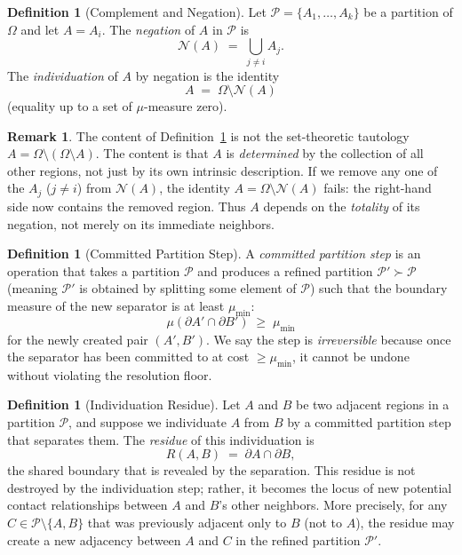 \documentclass[twocolumn]{article}
\theoremstyle{plain}
\theoremstyle{definition}
\newtheorem{definition}[theorem]{Definition}
\newtheorem{remark}[theorem]{Remark}
\newcommand{\PP}{\mathcal{P}}
\newcommand{\NN}{\mathcal{N}}
\newcommand{\mumin}{\mu_{\min}}
\begin{document}
\begin{definition}[Complement and Negation]
\label{def:negation}
Let $\PP = \{A_1, \ldots, A_k\}$ be a partition of $\Omega$ and let $A = A_i$.
The \emph{negation} of $A$ in $\PP$ is
\[
  \NN(A) \;=\; \bigcup_{j \neq i} A_j.
\]
The \emph{individuation} of $A$ by negation is the identity
\[
  A \;=\; \Omega \setminus \NN(A)
\]
(equality up to a set of $\mu$-measure zero).
\end{definition}

\begin{remark}
The content of Definition~\ref{def:negation} is not the set-theoretic tautology
$A = \Omega \setminus (\Omega \setminus A)$. The content is that $A$ is
\emph{determined} by the collection of all other regions, not just by its own
intrinsic description. If we remove any one of the $A_j$ ($j \neq i$) from
$\NN(A)$, the identity $A = \Omega \setminus \NN(A)$ fails: the right-hand side
now contains the removed region. Thus $A$ depends on the \emph{totality} of its
negation, not merely on its immediate neighbors.
\end{remark}

\begin{definition}[Committed Partition Step]
\label{def:committed}
A \emph{committed partition step} is an operation that takes a partition $\PP$
and produces a refined partition $\PP' \succ \PP$ (meaning $\PP'$ is obtained by
splitting some element of $\PP$) such that the boundary measure of the new
separator is at least $\mumin$:
\[
  \mu(\partial A' \cap \partial B') \;\geq\; \mumin
\]
for the newly created pair $(A', B')$. We say the step is \emph{irreversible}
because once the separator has been committed to at cost $\geq \mumin$, it cannot
be undone without violating the resolution floor.
\end{definition}

\begin{definition}[Individuation Residue]
\label{def:residue}
Let $A$ and $B$ be two adjacent regions in a partition $\PP$, and suppose we
individuate $A$ from $B$ by a committed partition step that separates them.
The \emph{residue} of this individuation is
\[
  R(A,B) \;=\; \partial A \cap \partial B,
\]
the shared boundary that is revealed by the separation. This residue is not
destroyed by the individuation step; rather, it becomes the locus of new
potential contact relationships between $A$ and $B$'s other neighbors. More
precisely, for any $C \in \PP \setminus \{A, B\}$ that was previously adjacent
only to $B$ (not to $A$), the residue may create a new adjacency between $A$
and $C$ in the refined partition $\PP'$.
\end{definition}
\end{document}
